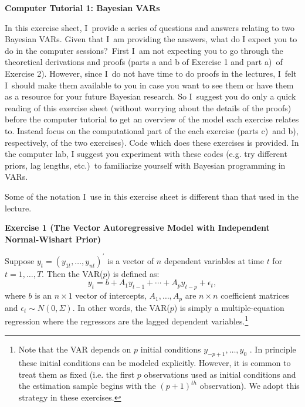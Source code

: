 \documentclass{article}
\begin{document}
\begin{center}
\textbf{Computer Tutorial 1: Bayesian VARs}
\end{center}

In this exercise sheet, I\ provide a series of questions and answers
relating to two Bayesian VARs. Given that I\ am providing the answers, what
do I expect you to do in the computer sessions?\ First I\ am not expecting
you to go through the theoretical derivations and proofs (parts a and b of
Exercise 1 and part a)\ of Exercise 2). However, since I\ do not have time
to do proofs in the lectures, I\ felt I\ should make them available to you
in case you want to see them or have them as a resource for your future
Bayesian research. So I\ suggest you do only a quick reading of this
exercise sheet (without worrying about the details of the proofs) before the
computer tutorial to get an overview of the model each exercise relates to.
Instead focus on the computational part of the each exercise (parts c)\ and
b), respectively, of the two exercises). Code which does these exercises is
provided. In the computer lab, I suggest you experiment with these codes
(e.g. try different priors, lag lengths, etc.)\ to familiarize yourself with
Bayesian programming in VARs.

Some of the notation I\ use in this exercise sheet is different than that
used in the lecture.

\newpage

\begin{center}
\textbf{Exercise 1 (The Vector Autoregressive Model with Independent
Normal-Wishart Prior)}
\end{center}

Suppose $y_{t}=(y_{1t},\ldots ,y_{nt})^{\prime }$ is a vector of $n$
dependent variables at time $t$ for $t=1,\ldots ,T$. Then the VAR($p$) is
defined as: 
\begin{equation}
y_{t}=b+A_{1}y_{t-1}+\cdots +A_{p}y_{t-p}+\epsilon _{t},  \label{VAR-y}
\end{equation}%
where $b$ is an $n\times 1$ vector of intercepts, $A_{1},\ldots ,A_{p}$ are $%
n\times n$ coefficient matrices and $\epsilon _{t}\sim N(0,\Sigma )$. In
other words, the VAR($p$) is simply a multiple-equation regression where the
regressors are the lagged dependent variables.\footnote{%
Note that the VAR depends on $p$ initial conditions $y_{-p+1},\ldots ,y_{0}$%
. In principle these initial conditions can be modeled explicitly. However,
it is common to treat them as fixed (i.e. the first $p$ observations used as
initial conditions and the estimation sample begins with the $\left(
p+1\right) ^{th}$ observation). We adopt this strategy in these exercises.}
\end{document}
